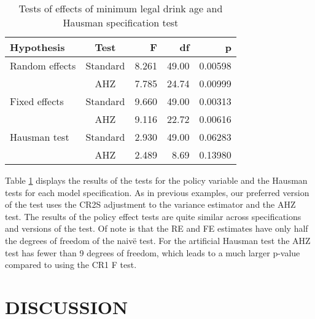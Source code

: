 \documentclass[12pt]{article}\usepackage[]{graphicx}\usepackage[]{color}
\begin{document}
\begin{table}[bth]
\centering
\begin{tabular}{lcrrr}
  \toprule
Hypothesis & Test & F & df & p \\ 
  \midrule
Random effects & Standard & 8.261 & 49.00 & 0.00598 \\ 
   & AHZ & 7.785 & 24.74 & 0.00999 \\ 
  Fixed effects & Standard & 9.660 & 49.00 & 0.00313 \\ 
   & AHZ & 9.116 & 22.72 & 0.00616 \\ 
   \midrule
Hausman test & Standard & 2.930 & 49.00 & 0.06283 \\ 
   & AHZ & 2.489 & 8.69 & 0.13980 \\ 
   \bottomrule
\end{tabular}
\caption{Tests of effects of minimum legal drink age and Hausman specification test} 
\label{tab:MLDA}
\end{table}


Table \ref{tab:MLDA} displays the results of the tests for the policy variable and the Hausman tests for each model specification. 
As in previous examples, our preferred version of the test uses the CR2S adjustment to the variance estimator and the AHZ test. 
The results of the policy effect tests are quite similar across specifications and versions of the test. 
Of note is that the RE and FE estimates have only half the degrees of freedom of the naiv\"e test. 
For the artificial Hausman test the AHZ test has fewer than 9 degrees of freedom, which leads to a much larger p-value compared to using the CR1 F test. 

\section{DISCUSSION}
\label{sec:discussion}



\end{document}
